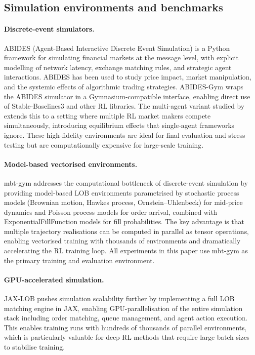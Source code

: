 \documentclass[11pt]{article}
\begin{document}
\subsection{Simulation environments and benchmarks}

\paragraph{Discrete-event simulators.}
ABIDES (Agent-Based Interactive Discrete Event Simulation)
\parencite{byrd2019abides} is a Python framework for simulating
financial markets at the message level, with explicit modelling of
network latency, exchange matching rules, and strategic agent
interactions.
ABIDES has been used to study price impact, market manipulation, and
the systemic effects of algorithmic trading strategies.
ABIDES-Gym \parencite{amrouni2021abidesgym} wraps the ABIDES simulator
in a Gymnasium-compatible interface, enabling direct use of
Stable-Baselines3 and other RL libraries.
The multi-agent variant studied by \textcite{karpe2020marl} extends this
to a setting where multiple RL market makers compete simultaneously,
introducing equilibrium effects that single-agent frameworks ignore.
These high-fidelity environments are ideal for final evaluation and
stress testing but are computationally expensive for large-scale training.

\paragraph{Model-based vectorised environments.}
mbt-gym \parencite{jerome2023mbtgym} addresses the computational
bottleneck of discrete-event simulation by providing model-based LOB
environments parametrised by stochastic process models (Brownian
motion, Hawkes process, Ornstein--Uhlenbeck) for mid-price dynamics
and Poisson process models for order arrival, combined with
ExponentialFillFunction models for fill probabilities.
The key advantage is that multiple trajectory realisations can be
computed in parallel as tensor operations, enabling vectorised training
with thousands of environments and dramatically accelerating the RL
training loop.
All experiments in this paper use mbt-gym as the primary training and
evaluation environment.

\paragraph{GPU-accelerated simulation.}
JAX-LOB \parencite{frey2023jaxlob_acm,frey2023jaxlob_arxiv} pushes
simulation scalability further by implementing a full LOB matching engine
in JAX, enabling GPU-parallelisation of the entire simulation stack
including order matching, queue management, and agent action execution.
This enables training runs with hundreds of thousands of parallel
environments, which is particularly valuable for deep RL methods that
require large batch sizes to stabilise training.
\end{document}
